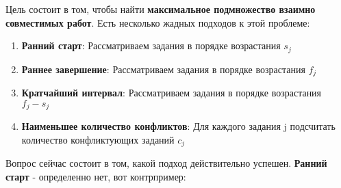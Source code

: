 Цель состоит в том, чтобы найти \textbf{максимальное подмножество взаимно совместимых работ}. Есть несколько жадных подходов к этой проблеме:

\begin{enumerate}
    \item \textbf{Ранний старт}: Рассматриваем задания в порядке возрастания { $s_j$}
    \item \textbf{Раннее завершение}: Рассматриваем задания в порядке возрастания { $f_j$}
    \item \textbf{Кратчайший интервал}: Рассматриваем задания в порядке возрастания { $f_j-s_j$}
    \item \textbf{Наименьшее количество конфликтов}: Для каждого задания { j} подсчитать количество конфликтующих заданий { $c_j$}
\end{enumerate}

\vspace{\baselineskip}

Вопрос сейчас состоит в том, какой подход действительно успешен. \textbf{Ранний старт} - определенно нет, вот контрпример:

